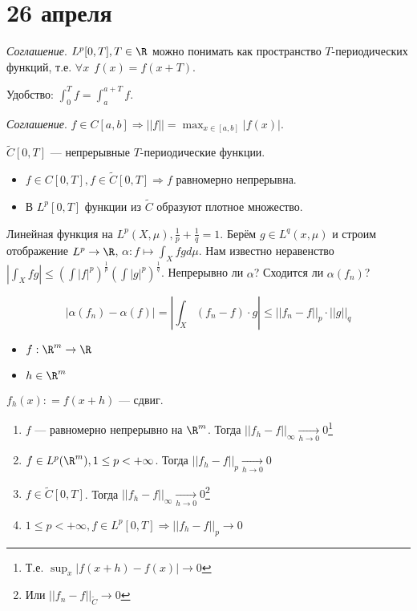 \chapter{26 апреля}

\textit{Соглашение}. \(L^p[0, T], T\in\R\) можно понимать как пространство \(T\)-периодических функций, т.е. \(\forall x \ \ f(x) = f(x + T)\).

\? %

Удобство: \(\int_0^T f = \int_a^{a + T} f\).

\textit{Соглашение}. \(f \in C[a, b] \Rightarrow ||f|| = \max_{x\in[a,b]} |f(x)|\).

\(\widetilde{C}[0, T]\) --- непрерывные \(T\)-периодические функции.
\begin{itemize}
    \item \(f \in C[0, T], f \in \widetilde{C}[0, T] \Rightarrow f\) равномерно непрерывна.
    \item В \(L^p[0, T]\) функции из \(\widetilde{C}\) образуют плотное множество.
\end{itemize}

Линейная функция на \(L^p(X, \mu), \frac{1}{p} + \frac{1}{q} = 1\). Берём \(g \in L^q(x, \mu)\) и строим отображение \(L^p \to \R\), \(\alpha : f \mapsto \int_X fg d\mu\). Нам известно неравенство \(|\int_X fg| \leq (\int |f|^p)^{\frac{1}{p}} (\int |g|^p)^{\frac{1}{q}}\). Непрерывно ли \(\alpha\)? Сходится ли \(\alpha(f_n)\)?

\[|\alpha(f_n) - \alpha(f)| = \left|\int_X (f_n - f) \cdot g\right| \leq ||f_n - f||_p \cdot ||g||_q\]

\begin{definition}\itemfix
    \begin{itemize}
        \item \(f : \R^m \to \R\)
        \item \(h \in \R^m\)
    \end{itemize}

    \(f_h(x) : = f(x + h)\) --- сдвиг.
\end{definition}

\begin{theorem}\itemfix
    \begin{enumerate}
        \item \(f\) --- равномерно непрерывно на \(\R^m\). Тогда \(||f_h - f||_{\infty} \xrightarrow[h \to 0]{} 0\)\footnote{Т.е. \(\sup_x |f(x + h) - f(x)| \to 0\)}
        \item \(f \in L^p(\R^m), 1 \leq p < +\infty\). Тогда \(||f_h - f||_p \xrightarrow[h \to 0]{} 0\)
        \item \(f \in \widetilde{C}[0, T]\). Тогда \(||f_h - f||_{\infty} \xrightarrow[h \to 0]{} 0\)\footnote{Или \(||f_n - f||_{\widetilde{C}} \to 0\)}
        \item \(1 \leq p < +\infty, f \in L^p[0, T] \Rightarrow ||f_h - f||_p \to 0\)
    \end{enumerate}
\end{theorem}

